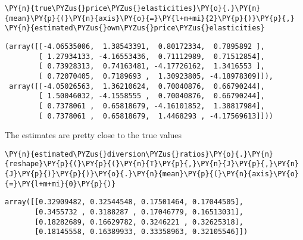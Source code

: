     \begin{tcolorbox}[breakable, size=fbox, boxrule=1pt, pad at break*=1mm,colback=cellbackground, colframe=cellborder]
\begin{Verbatim}[commandchars=\\\{\}]
\PY{n}{true\PYZus{}price\PYZus{}elasticities}\PY{o}{.}\PY{n}{mean}\PY{p}{(}\PY{n}{axis}\PY{o}{=}\PY{l+m+mi}{2}\PY{p}{)}\PY{p}{,} \PY{n}{estimated\PYZus{}own\PYZus{}price\PYZus{}elasticities}
\end{Verbatim}
\end{tcolorbox}

            \begin{tcolorbox}[breakable, size=fbox, boxrule=.5pt, pad at break*=1mm, opacityfill=0]
\begin{Verbatim}[commandchars=\\\{\}]
(array([[-4.06535006,  1.38543391,  0.80172334,  0.7895892 ],
        [ 1.27934133, -4.16553436,  0.71112989,  0.71512854],
        [ 0.73928313,  0.74163481, -4.17726162,  1.3416553 ],
        [ 0.72070405,  0.7189693 ,  1.30923805, -4.18978309]]),
 array([[-4.05026563,  1.36210624,  0.70040876,  0.66790244],
        [ 1.50046032, -4.1558555 ,  0.70040876,  0.66790244],
        [ 0.7378061 ,  0.65818679, -4.16101852,  1.38817984],
        [ 0.7378061 ,  0.65818679,  1.4468293 , -4.17569613]]))
\end{Verbatim}
\end{tcolorbox}

    The estimates are pretty close to the true values

    \begin{tcolorbox}[breakable, size=fbox, boxrule=1pt, pad at break*=1mm,colback=cellbackground, colframe=cellborder]
\begin{Verbatim}[commandchars=\\\{\}]
\PY{n}{estimated\PYZus{}diversion\PYZus{}ratios}\PY{o}{.}\PY{n}{reshape}\PY{p}{(}\PY{p}{(}\PY{n}{T}\PY{p}{,}\PY{n}{J}\PY{p}{,}\PY{n}{J}\PY{p}{)}\PY{p}{)}\PY{o}{.}\PY{n}{mean}\PY{p}{(}\PY{n}{axis}\PY{o}{=}\PY{l+m+mi}{0}\PY{p}{)}
\end{Verbatim}
\end{tcolorbox}

            \begin{tcolorbox}[breakable, size=fbox, boxrule=.5pt, pad at break*=1mm, opacityfill=0]
\begin{Verbatim}[commandchars=\\\{\}]
array([[0.32909482, 0.32544548, 0.17501464, 0.17044505],
       [0.3455732 , 0.3188287 , 0.17046779, 0.16513031],
       [0.18282689, 0.16629782, 0.3246221 , 0.32625318],
       [0.18145558, 0.16389933, 0.33358963, 0.32105546]])
\end{Verbatim}
\end{tcolorbox}

